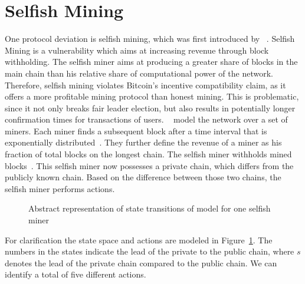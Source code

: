 \section{Selfish Mining}\label{eyalmodel}
One protocol deviation is selfish mining, which was first introduced by \citeauthor{eyal}~\cite{eyal}.
Selfish Mining is a vulnerability which aims at increasing revenue through block withholding. The selfish miner aims at producing a greater share of blocks in the main chain than his relative share of computational power of the network. Therefore, selfish mining violates Bitcoin's incentive compatibility claim, as it offers a more profitable mining protocol than honest mining. This is problematic, since it not only breaks fair leader election, but also results in potentially longer confirmation times for transactions of users.
~\citeauthor{eyal} model the network over a set of miners. Each miner finds a subsequent block after a time interval that is exponentially distributed~\cite{eyal}. They further define the revenue of a miner as his fraction of total blocks on the longest chain.
The selfish miner withholds mined blocks~\cite{eyal}. This selfish miner now possesses a private chain, which differs from the publicly known chain. Based on the difference between those two chains, the selfish miner performs actions. 
\begin{figure}[t]
\begin{center}
\end{center}
   \caption{Abstract representation of state transitions of  model for one selfish miner}
\label{fig:eyal_model}

\end{figure}
For clarification the state space and actions are modeled in Figure~\ref{fig:eyal_model}. The numbers in the states indicate the lead of the private to the public chain, where $s$ denotes the lead of the private chain compared to the public chain. We can identify a total of five different actions.
